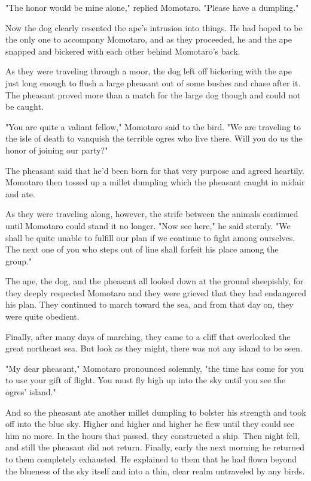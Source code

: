 "The honor would be mine alone," replied Momotaro. "Please have a dumpling."

Now the dog clearly resented the ape's intrusion into things. He had hoped to be the only one to accompany Momotaro, and as they proceeded, he and the ape snapped and bickered with each other behind Momotaro's back.

As they were traveling through a moor, the dog left off bickering with the ape just long enough to flush a large pheasant out of some bushes and chase after it. The pheasant proved more than a match for the large dog though and could not be caught.

"You are quite a valiant fellow," Momotaro said to the bird. "We are traveling to the isle of death to vanquish the terrible ogres who live there. Will you do us the honor of joining our party?"

The pheasant said that he'd been born for that very purpose and agreed heartily. Momotaro then tossed up a millet dumpling which the pheasant caught in midair and ate.

As they were traveling along, however, the strife between the animals continued until Momotaro could stand it no longer. "Now see here," he said sternly. "We shall be quite unable to fulfill our plan if we continue to fight among ourselves. The next one of you who steps out of line shall forfeit his place among the group."

The ape, the dog, and the pheasant all looked down at the ground sheepishly, for they deeply respected Momotaro and they were grieved that they had endangered his plan. They continued to march toward the sea, and from that day on, they were quite obedient.

Finally, after many days of marching, they came to a cliff that overlooked the great northeast sea. But look as they might, there was not any island to be seen.

"My dear pheasant," Momotaro pronounced solemnly, "the time has come for you to use your gift of flight. You must fly high up into the sky until you see the ogres' island."

And so the pheasant ate another millet dumpling to bolster his strength and took off into the blue sky. Higher and higher and higher he flew until they could see him no more. In the hours that passed, they constructed a ship. Then night fell, and still the pheasant did not return. Finally, early the next morning he returned to them completely exhausted. He explained to them that he had flown beyond the blueness of the sky itself and into a thin, clear realm untraveled by any birds.

